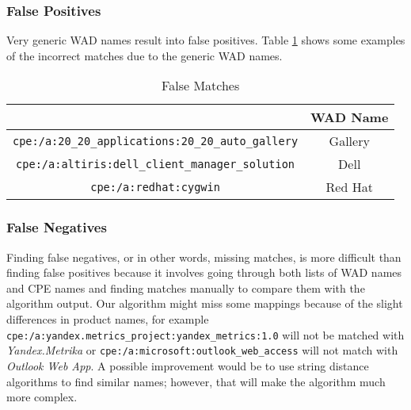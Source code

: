 \subsubsection{False Positives}
Very generic WAD names result into false positives. Table \ref{table:false_positives} shows some examples of the incorrect matches due to the generic WAD names. 
\begin{table}
\begin{center}
    \begin{tabular}{ | c | c | }
    
    \hline
	  \hhline{|*2-}
    \multicolumn{1}{|c|}{\cellcolor{LightBlue}\textbf{CPE}} & \multicolumn{1}{|c|}{\cellcolor{LightBlue}\textbf{WAD Name}}  
    \\ \hline
    \texttt{cpe:/a:20\_20\_applications:20\_20\_auto\_gallery} & Gallery
        \\ \hline
    \texttt{cpe:/a:altiris:dell\_client\_manager\_solution} & Dell
        \\ \hline
    \texttt{cpe:/a:redhat:cygwin} & Red Hat
        \\ \hline
    \end{tabular}
    \caption{False Matches}
    \label{table:false_positives}
   \end{center}
\end{table}

\subsubsection{False Negatives}
Finding false negatives, or in other words, missing matches, is more difficult than finding false positives because it involves going through both lists of WAD names and CPE names and finding matches manually to compare them with the algorithm output. Our algorithm might miss some mappings because of the  slight differences in product names, for example  \texttt{cpe:/a:yandex.metrics\_project:yandex\_metrics:1.0} will not be matched with \textit{Yandex.Metrika} or \texttt{cpe:/a:microsoft:outlook\_web\_access} will not match with \textit{Outlook Web App}. A possible improvement would be to use string distance algorithms to find similar names; however, that will make the algorithm much more complex.

